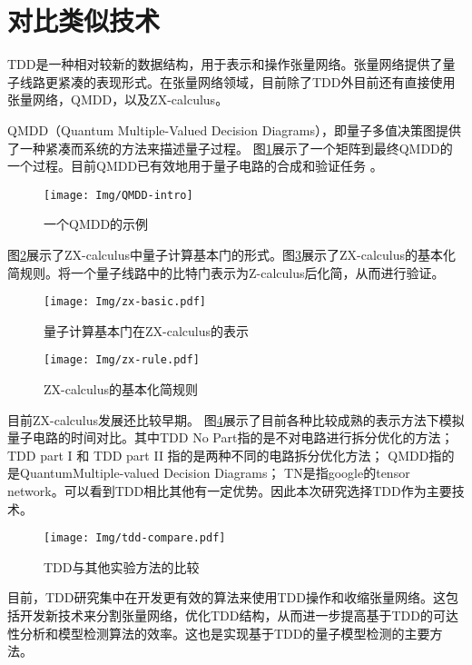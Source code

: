 \section{对比类似技术}
TDD是一种相对较新的数据结构，用于表示和操作张量网络。张量网络提供了量子线路更紧凑的表现形式。在张量网络领域，目前除了TDD外目前还有直接使用张量网络，QMDD\citep{1623982}，以及ZX-calculus\citep{van2020zx}。

QMDD（Quantum Multiple-Valued Decision Diagrams），即量子多值决策图提供了一种紧凑而系统的方法来描述量子过程。
图\ref{fig:qmdd-basic}展示了一个矩阵到最终QMDD的一个过程。目前QMDD已有效地用于量子电路的合成\citep{niemann2020advanced}和验证任务
\citep{burgholzer2020verifying,burgholzer2020advanced}。
\begin{figure}[!htbp]
    \centering
    \texttt{[image: Img/QMDD-intro]}
    \caption{一个QMDD的示例}
    \label{fig:qmdd-basic}
\end{figure}

图\ref{fig:zx-basic}展示了ZX-calculus中量子计算基本门的形式。图\ref{fig:zx-rule}展示了ZX-calculus的基本化简规则。将一个量子线路中的比特门表示为Z-calculus后化简，从而进行验证。

\begin{figure}[!htbp]
    \centering
    \texttt{[image: Img/zx-basic.pdf]}
    \caption{量子计算基本门在ZX-calculus的表示}
    \label{fig:zx-basic}
\end{figure}
\begin{figure}[!htbp]
    \centering
    \texttt{[image: Img/zx-rule.pdf]}
    \caption{ZX-calculus的基本化简规则}
    \label{fig:zx-rule}
\end{figure}
 
目前ZX-calculus发展还比较早期。
图\ref{fig:tdd-compare}展示了目前各种比较成熟的表示方法下模拟量子电路的时间对比。其中TDD No Part指的是不对电路进行拆分优化的方法；TDD part I 和 TDD part II 指的是两种不同的电路拆分优化方法；
QMDD指的是QuantumMultiple-valued Decision Diagrams；
TN是指google的tensor network。可以看到TDD相比其他有一定优势。因此本次研究选择TDD作为主要技术。

\begin{figure}[!htbp]
    \centering
    \texttt{[image: Img/tdd-compare.pdf]}
    \caption{TDD与其他实验方法的比较\citep{Hong_2022}}
    \label{fig:tdd-compare}
\end{figure}

目前，TDD研究集中在开发更有效的算法来使用TDD操作和收缩张量网络。这包括开发新技术来分割张量网络，优化TDD结构，从而进一步提高基于TDD的可达性分析和模型检测算法的效率。这也是实现基于TDD的量子模型检测的主要方法。

